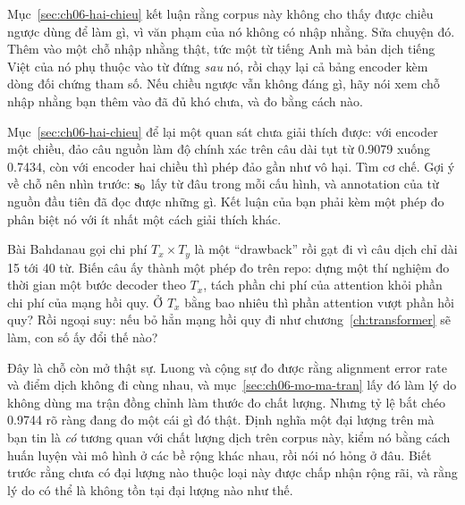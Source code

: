 \begin{bt}
  \item Mục~\ref{sec:ch06-hai-chieu} kết luận rằng corpus này không cho thấy
    được chiều ngược dùng để làm gì, vì văn phạm của nó không có nhập nhằng.
    Sửa chuyện đó. Thêm vào  một chỗ nhập nhằng thật, tức
    một từ tiếng Anh mà bản dịch tiếng Việt của nó phụ thuộc vào từ đứng
    \emph{sau} nó, rồi chạy lại cả bảng encoder kèm dòng đối chứng tham số.
    Nếu chiều ngược vẫn không đáng gì, hãy nói xem chỗ nhập nhằng bạn thêm vào
    đã đủ khó chưa, và đo bằng cách nào.

  \item Mục~\ref{sec:ch06-hai-chieu} để lại một quan sát chưa giải thích được:
    với encoder một chiều, đảo câu nguồn làm độ chính xác trên câu dài tụt từ
    0.9079 xuống 0.7434, còn với encoder hai chiều thì phép đảo gần như vô
    hại. Tìm cơ chế. Gợi ý về chỗ nên nhìn trước: \(\mathbf{s}_0\) lấy từ đâu
    trong mỗi cấu hình, và annotation của từ nguồn đầu tiên đã đọc được những
    gì. Kết luận của bạn phải kèm một phép đo phân biệt nó với ít nhất một
    cách giải thích khác.

  \item Bài Bahdanau gọi chi phí \(T_x \times T_y\) là một \enquote{drawback}
    rồi gạt đi vì câu dịch chỉ dài 15 tới 40 từ. Biến câu ấy thành một phép đo
    trên repo: dựng một thí nghiệm đo thời gian một bước decoder theo \(T_x\),
    tách phần chi phí của attention khỏi phần chi phí của mạng hồi quy. Ở
    \(T_x\) bằng bao nhiêu thì phần attention vượt phần hồi quy? Rồi ngoại suy:
    nếu bỏ hẳn mạng hồi quy đi như chương~\ref{ch:transformer} sẽ làm, con số
    ấy đổi thế nào?

  \item Đây là chỗ còn mở thật sự. Luong và cộng sự đo được rằng alignment
    error rate và điểm dịch không đi cùng nhau, và
    mục~\ref{sec:ch06-mo-ma-tran} lấy đó làm lý do không dùng ma trận đồng
    chỉnh làm thước đo chất lượng. Nhưng tỷ lệ bắt chéo 0.9744 rõ ràng đang đo
    một cái gì đó thật. Định nghĩa một đại lượng trên
     mà
    bạn tin là \emph{có} tương quan với chất lượng dịch trên corpus này, kiểm
    nó bằng cách huấn luyện vài mô hình ở các bề rộng khác nhau, rồi nói nó
    hỏng ở đâu. Biết trước rằng chưa có đại lượng nào thuộc loại này được chấp
    nhận rộng rãi, và rằng lý do có thể là không tồn tại đại lượng nào như thế.
\end{bt}
